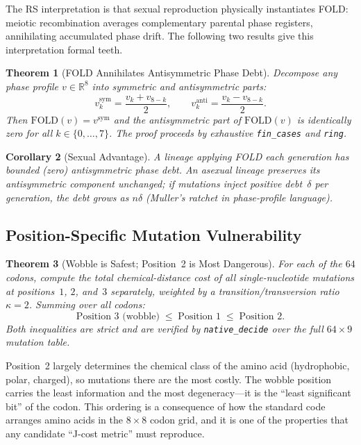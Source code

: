 \documentclass[11pt,a4paper]{article}
\newtheorem{theorem}{Theorem}[section]
\newtheorem{corollary}[theorem]{Corollary}
\newcommand{\RR}{\mathbb{R}}
\begin{document}
The RS interpretation is that sexual reproduction physically instantiates FOLD: meiotic recombination averages complementary parental phase registers, annihilating accumulated phase drift.  The following two results give this interpretation formal teeth.

\begin{theorem}[FOLD Annihilates Antisymmetric Phase Debt]
\label{thm:fold-cancel}
Decompose any phase profile $v \in \RR^8$ into symmetric and antisymmetric parts:
\[
v^{\mathrm{sym}}_k = \frac{v_k + v_{8-k}}{2},\qquad
v^{\mathrm{anti}}_k = \frac{v_k - v_{8-k}}{2}.
\]
Then $\mathrm{FOLD}(v) = v^{\mathrm{sym}}$ and the antisymmetric part of $\mathrm{FOLD}(v)$ is identically zero for all $k \in \{0,\ldots,7\}$.  The proof proceeds by exhaustive \texttt{fin\_cases} and \texttt{ring}.
\end{theorem}

\begin{corollary}[Sexual Advantage]
\label{cor:sex}
A lineage applying FOLD each generation has bounded (zero) antisymmetric phase debt.  An asexual lineage preserves its antisymmetric component unchanged; if mutations inject positive debt~$\delta$ per generation, the debt grows as $n\delta$ (Muller's ratchet in phase-profile language).
\end{corollary}

\subsection{Position-Specific Mutation Vulnerability}

\begin{theorem}[Wobble is Safest; Position~2 is Most Dangerous]
\label{thm:posorder}
For each of the $64$ codons, compute the total chemical-distance cost of all single-nucleotide mutations at positions~$1$, $2$, and~$3$ separately, weighted by a transition/transversion ratio $\kappa = 2$.  Summing over all codons:
\[
\text{Position 3 (wobble)} \;\leq\; \text{Position 1} \;\leq\; \text{Position 2}.
\]
Both inequalities are strict and are verified by \texttt{native\_decide} over the full $64 \times 9$ mutation table.
\end{theorem}

Position~2 largely determines the chemical class of the amino acid (hydrophobic, polar, charged), so mutations there are the most costly.  The wobble position carries the least information and the most degeneracy---it is the ``least significant bit'' of the codon.  This ordering is a consequence of how the standard code arranges amino acids in the $8 \times 8$ codon grid, and it is one of the properties that any candidate ``J-cost metric'' must reproduce.
\end{document}

